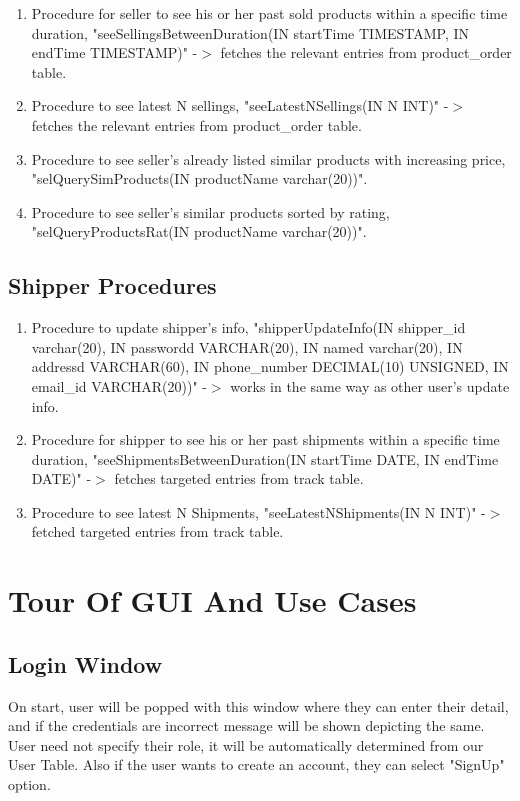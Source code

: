 \documentclass[a4paper,12pt]{article}
\begin{document}
\begin{enumerate}
  \item Procedure for seller to see his or her past sold products within a specific time duration, "seeSellingsBetweenDuration(IN startTime TIMESTAMP, IN endTime TIMESTAMP)" -$>$ fetches the relevant entries from product\_order table.
  \item Procedure to see latest N sellings, "seeLatestNSellings(IN N INT)" -$>$ fetches the relevant entries from product\_order table.
  \item Procedure to see seller's already listed similar products with increasing price, "selQuerySimProducts(IN productName varchar(20))".
  \item Procedure to see seller's similar products sorted by rating, "selQueryProductsRat(IN productName varchar(20))".
\end{enumerate}
\subsection{Shipper Procedures}
\begin{enumerate}
  \item Procedure to update shipper's info, "shipperUpdateInfo(IN shipper\_id varchar(20), IN passwordd VARCHAR(20), IN named varchar(20), IN addressd VARCHAR(60), IN phone\_number DECIMAL(10) UNSIGNED, IN email\_id VARCHAR(20))" -$>$ works in the same way as other user's update info.
  \item Procedure for shipper to see his or her past shipments within a specific time duration, "seeShipmentsBetweenDuration(IN startTime DATE, IN endTime DATE)" -$>$ fetches targeted entries from track table.
  \item Procedure to see latest N Shipments, "seeLatestNShipments(IN N INT)" -$>$ fetched targeted entries from track table.
\end{enumerate}

\section{Tour Of GUI And Use Cases}
\subsection{Login Window}
On start, user will be popped with this window where they can enter their detail, and if the credentials are incorrect message will be shown depicting the same. User need not specify their role, it will be automatically determined from our User Table. Also if the user wants to create an account, they can select "SignUp" option.
\end{document}
